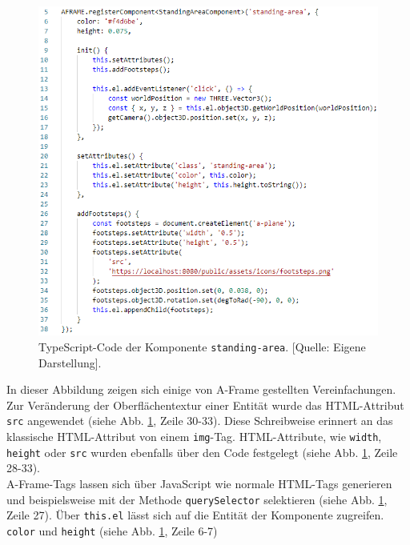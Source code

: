 \documentclass[a4paper,12pt,oneside]{article}
\begin{document}
        \begin{figure}
          \centering
          \includegraphics[scale=0.9]{img/coding/standing-area2.png}
          \caption[TypeScript-Code der Komponente \texttt{standing-area}.]{TypeScript-Code der Komponente \texttt{standing-area}. [Quelle: Eigene Darstellung].}
          \label{fig:standing-area2}
        \end{figure}
        In dieser Abbildung zeigen sich einige von A-Frame gestellten
        Vereinfachungen. Zur Veränderung der Oberflächentextur
        einer Entität wurde das HTML-Attribut \texttt{src} angewendet
        (siehe Abb. \ref{fig:standing-area2}, Zeile 30-33). 
        Diese Schreibweise erinnert an das klassische
        HTML-Attribut von einem \texttt{img}-Tag.
        HTML-Attribute, wie \texttt{width},
        \texttt{height} oder \texttt{src} wurden ebenfalls über den Code
        festgelegt 
        (siehe Abb. \ref{fig:standing-area2}, Zeile 28-33). \\
        A-Frame-Tags lassen sich über JavaScript wie normale HTML-Tags
        generieren und beispielsweise mit der Methode \texttt{querySelector}
        selektieren
        (siehe Abb. \ref{fig:standing-area2}, Zeile 27). Über \texttt{this.el}
        lässt sich auf die Entität der Komponente zugreifen. \\
        \texttt{color} und \texttt{height} 
        (siehe Abb. \ref{fig:standing-area2}, Zeile 6-7)
\end{document}
